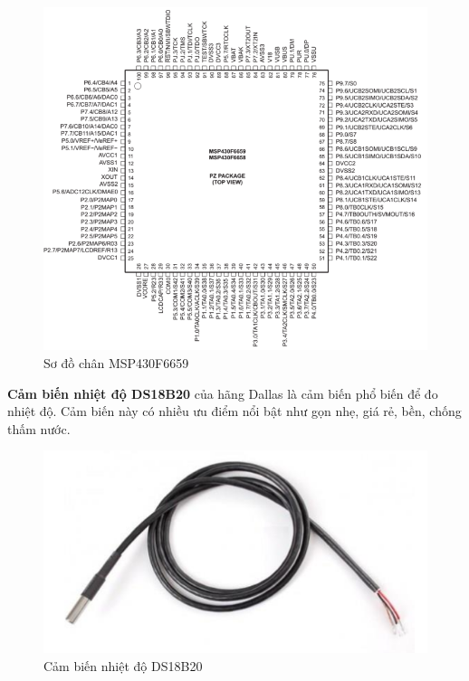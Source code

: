\documentclass{report}
\begin{document}
\begin{figure}[h]
	\centering
	\includegraphics[scale = 0.5]{fig43.png}
	\caption{Sơ đồ chân MSP430F6659}
	\label{fig:Graph43}
\end{figure}

\textbf{Cảm biến nhiệt độ DS18B20} của hãng Dallas là cảm biến phổ biến để đo nhiệt độ. Cảm
biến này có nhiều ưu điểm nổi bật như gọn nhẹ, giá rẻ, bền, chống thấm nước.
\begin{figure}[h]
	\centering
	\includegraphics[scale = 0.5]{fig44.png}
	\caption{Cảm biến nhiệt độ DS18B20}
	\label{fig:Graph44}
\end{figure}
\end{document}

